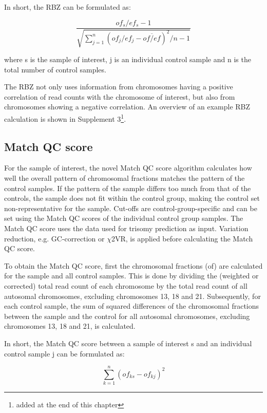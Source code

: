 In short, the RBZ can be formulated as:

\begin{equation*}
	\frac{of_s / ef_s - 1}{\sqrt{\sum^n_{j=1}(of_j / ef_j - \overline{of/ef})^2 / n - 1}}
\end{equation*}

\noindent where s is the sample of interest, j is an individual control sample and n is the total number of control samples.

The RBZ not only uses information from chromosomes having a positive correlation of read counts with the chromosome of interest, but also from chromosomes showing a negative correlation. 
An overview of an example RBZ calculation is shown in Supplement 3\footnote{added at the end of this chapter}.

\subsection{Match QC score}
For the sample of interest, the novel Match QC score algorithm calculates how well the overall pattern of chromosomal fractions matches the pattern of the control samples. 
If the pattern of the sample differs too much from that of the controls, the sample does not fit within the control group, making the control set non-representative for the sample. 
Cut-offs are control-group-specific and can be set using the Match QC scores of the individual control group samples. 
The Match QC score uses the data used for trisomy prediction as input. 
Variation reduction, e.g. GC-correction or $\chi$2VR, is applied before calculating the Match QC score.

To obtain the Match QC score, first the chromosomal fractions (of) are calculated for the sample and all control samples. 
This is done by dividing the (weighted or corrected) total read count of each chromosome by the total read count of all autosomal chromosomes, excluding chromosomes 13, 18 and 21. 
Subsequently, for each control sample, the sum of squared differences of the chromosomal fractions between the sample and the control for all autosomal chromosomes, excluding chromosomes 13, 18 and 21, is calculated.

In short, the Match QC score between a sample of interest s and an individual control sample j can be formulated as:

\begin{equation*}
	\sum^n_{k=1}(of_{ks} - of_{kj})^2
\end{equation*}


